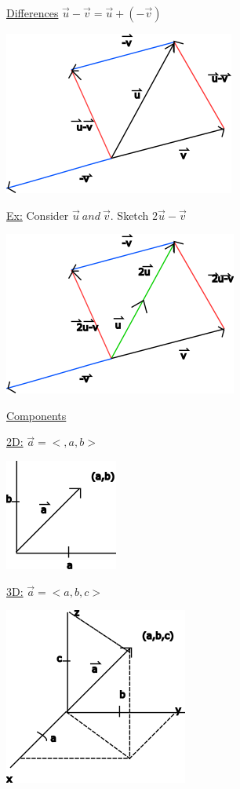 \documentclass[10pt]{article}
\begin{document}
\underline{Differences} $\vec{u} - \vec{v} = \vec{u} + (-\vec{v})$ 

\includegraphics{vectordifference}

\underline{Ex:} Consider $\vec{u}\ and\ \vec{v}   $. Sketch $2 \vec{u}-\vec{v}$  

\includegraphics{vectordifference2}

\underline{Components}

\underline{2D:} $\vec{a} = <,a,b> $

\includegraphics{vectorcomponents2d}

\underline{3D:} $\vec{a}=<a,b,c>  $

\includegraphics{vectorcomponents3d}
\end{document}
